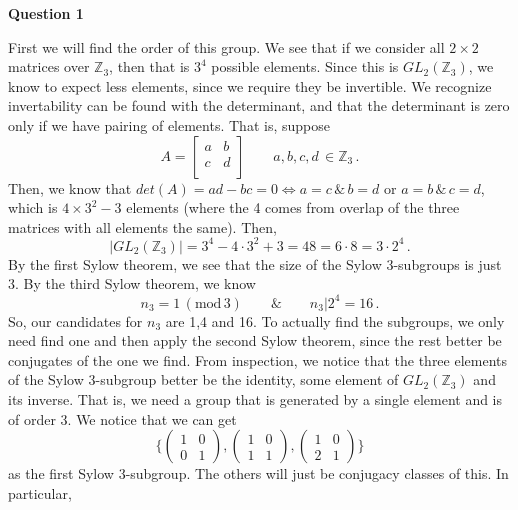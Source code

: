 \documentclass[10pt]{article}
\newcommand{\Z}{\mathbb{Z}}
\begin{document}
\textbf{Question 1}

First we will find the order of this group. We see that if we consider all $2\times 2$ matrices over $\Z_{3}$, then that is $3^{4}$ possible elements. Since this is $GL_{2}(\Z_{3})$, we know to expect less elements, since we require they be invertible. We recognize invertability can be found with the determinant, and that the determinant is zero only if we have pairing of elements. That is, suppose
\[ A =
\begin{bmatrix}
  a & b \\
  c & d \\
\end{bmatrix}
\hspace{2em} a,b,c,d \,\in \Z_{3} \, .\]
Then, we know that $det(A) = ad - bc = 0 \iff a=c \,\&\, b=d$ or $a=b \,\&\, c = d$, which is $4\times 3^{2} -3$ elements (where the 4 comes from overlap of the three matrices with all elements the same). Then,
\[ |GL_{2}(\Z_{3})| = 3^{4} - 4\cdot 3^{2} + 3 = 48 = 6\cdot 8 = 3\cdot2^{4}\,.\]
By the first Sylow theorem, we see that the size of the Sylow 3-subgroups is just 3. By the third Sylow theorem, we know
\[ n_{3} = 1 \, (\text{mod} \, 3) \hspace{2em} \& \hspace{2em} n_{3} | 2^{4} = 16 \,.\]
So, our candidates for $n_{3}$ are 1,4 and 16. To actually find the subgroups, we only need find one and then apply the second Sylow theorem, since the rest better be conjugates of the one we find. From inspection, we notice that the three elements of the Sylow 3-subgroup better be the identity, some element of $GL_{2}(\Z_{3})$ and its inverse. That is, we need a group that is generated by a single element and is of order 3. We notice that we can get
\[ \{(\begin{smallmatrix}1 & 0 \\ 0 & 1 \end{smallmatrix}),(\begin{smallmatrix}1 & 0 \\ 1 & 1 \end{smallmatrix}),(\begin{smallmatrix}1 & 0 \\ 2 & 1 \end{smallmatrix}) \} \]
as the first Sylow 3-subgroup. The others will just be conjugacy classes of this. In particular,
\end{document}
